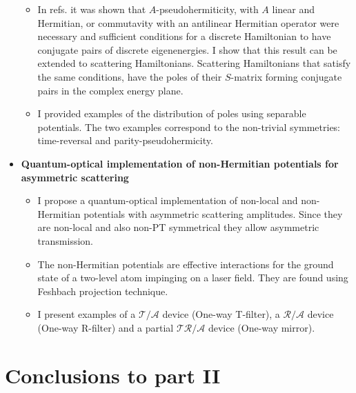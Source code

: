 \begin{itemize}
\begin{itemize}
    \item In refs. \cite{Mostafazadeh2002,Mostafazadeh2002a,Mostafazadeh2002b} it was shown that
    $A$-pseudohermiticity, with $A$ linear and Hermitian, or commutavity with an antilinear Hermitian operator were necessary and sufficient conditions for a discrete Hamiltonian to have conjugate pairs of discrete eigenenergies. I show that this result can be extended to scattering Hamiltonians. Scattering Hamiltonians that satisfy the same conditions, have the poles of their $S$-matrix forming conjugate pairs in the complex energy plane.

    \item I provided examples of the distribution of poles using separable potentials. The two examples correspond to the non-trivial symmetries: time-reversal and parity-pseudohermicity.

  \end{itemize}

  \item {\bf Quantum-optical implementation of non-Hermitian potentials for asymmetric scattering}
  \begin{itemize}
    \item I propose a quantum-optical implementation of non-local and non-Hermitian potentials
    with asymmetric scattering amplitudes. Since they are non-local and also non-PT symmetrical they allow asymmetric transmission.

    \item The non-Hermitian potentials are effective interactions for the ground state of a two-level atom impinging on a laser field. They are found using Feshbach projection technique.

    \item I present examples of a $\mathcal{T/A}$ device (One-way T-filter), a $\mathcal{R/A}$ device (One-way R-filter) and a partial $\mathcal{TR/A}$ device (One-way mirror).

  \end{itemize}

\end{itemize}

\section*{Conclusions to part II}

